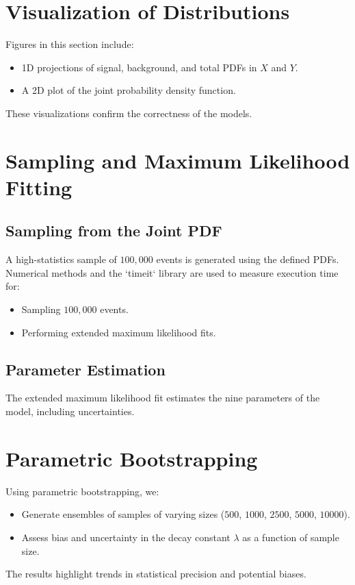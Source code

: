 \documentclass[12pt,a4paper]{article}
\begin{document}
\section{Visualization of Distributions}
\label{sec:visualization}
Figures in this section include:
\begin{itemize}
    \item 1D projections of signal, background, and total PDFs in $X$ and $Y$.
    \item A 2D plot of the joint probability density function.
\end{itemize}
These visualizations confirm the correctness of the models.

\section{Sampling and Maximum Likelihood Fitting}
\label{sec:fitting}
\subsection{Sampling from the Joint PDF}
A high-statistics sample of $100,000$ events is generated using the defined PDFs. Numerical methods and the `timeit` library are used to measure execution time for:
\begin{itemize}
    \item Sampling $100,000$ events.
    \item Performing extended maximum likelihood fits.
\end{itemize}
\subsection{Parameter Estimation}
The extended maximum likelihood fit estimates the nine parameters of the model, including uncertainties.

\section{Parametric Bootstrapping}
\label{sec:bootstrapping}
Using parametric bootstrapping, we:
\begin{itemize}
    \item Generate ensembles of samples of varying sizes ($500$, $1000$, $2500$, $5000$, $10000$).
    \item Assess bias and uncertainty in the decay constant $\lambda$ as a function of sample size.
\end{itemize}
The results highlight trends in statistical precision and potential biases.
\end{document}
